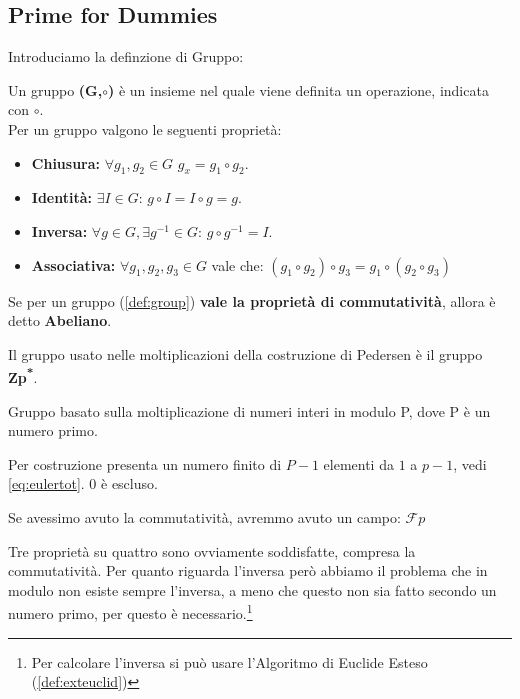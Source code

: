\subsection{Prime for Dummies}
Introduciamo la definzione di Gruppo:
\begin{definition}[Group]\label{def:group}
Un gruppo \textbf{(G,$\circ$)} è un insieme  nel quale viene definita un operazione, indicata con $\circ$.\\
Per un gruppo valgono le seguenti proprietà:
\begin{itemize}
    \item \textbf{Chiusura:} $\forall g_1,g_2\in{G}$ $g_x=g_1\circ g_2$.
    \item \textbf{Identità:} $\exists I\in{G}:\,g\circ I=I\circ g=g$.
    \item \textbf{Inversa:} $\forall g\in G, \exists g^{-1}\in G:\,g\circ g^{-1}=I$.
    \item \textbf{Associativa:} $\forall g_1,g_2,g_3 \in G$ vale che: $(g_1\circ g_2)\circ g_3=g_1\circ (g_2\circ g_3)$
\end{itemize}
\end{definition}
\begin{corollary}\label{cor:abelian}
Se per un gruppo (\cref{def:group}) \textbf{vale la proprietà di commutatività}, allora è detto \textbf{Abeliano}.
\end{corollary}
Il gruppo usato nelle moltiplicazioni della costruzione di Pedersen è il gruppo \textbf{Zp\textsuperscript{*}}.
\begin{definition}[Zp\textsuperscript{*}]
Gruppo basato sulla moltiplicazione di numeri interi in modulo P, dove P è un numero primo.
\begin{remark}
Per costruzione presenta un numero finito di $P-1$ elementi da $1$ a $p-1$, vedi \cref{eq:eulertot}. 0 è escluso.
\end{remark}
\end{definition}
\begin{remark}
Se avessimo avuto la commutatività, avremmo avuto un campo: $\mathcal{F}p$
\end{remark}
\begin{remark}
Tre proprietà su quattro sono ovviamente soddisfatte, compresa la commutatività. Per quanto riguarda l'inversa però abbiamo il problema che in modulo non esiste sempre l'inversa, a meno che questo non sia fatto secondo un numero primo, per questo è necessario.\footnote{Per calcolare l'inversa si può usare l'Algoritmo di Euclide Esteso (\cref{def:exteuclid})}
\end{remark}
